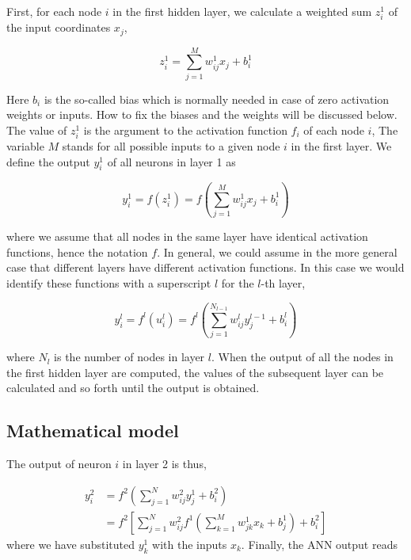 \documentclass[%
oneside,                 %
final,                   %
10pt]{article}
\begin{document}
First, for each node $i$ in the first hidden layer, we calculate a weighted sum $z_i^1$ of the input coordinates $x_j$,

\begin{equation} z_i^1 = \sum_{j=1}^{M} w_{ij}^1 x_j + b_i^1
\end{equation}

Here $b_i$ is the so-called bias which is normally needed in
case of zero activation weights or inputs. How to fix the biases and
the weights will be discussed below.  The value of $z_i^1$ is the
argument to the activation function $f_i$ of each node $i$, The
variable $M$ stands for all possible inputs to a given node $i$ in the
first layer.  We define  the output $y_i^1$ of all neurons in layer 1 as

\begin{equation}
 y_i^1 = f(z_i^1) = f\left(\sum_{j=1}^M w_{ij}^1 x_j  + b_i^1\right)
 \label{outputLayer1}
\end{equation}

where we assume that all nodes in the same layer have identical
activation functions, hence the notation $f$. In general, we could assume in the more general case that different layers have different activation functions.
In this case we would identify these functions with a superscript $l$ for the $l$-th layer,

\begin{equation}
 y_i^l = f^l(u_i^l) = f^l\left(\sum_{j=1}^{N_{l-1}} w_{ij}^l y_j^{l-1} + b_i^l\right)
 \label{generalLayer}
\end{equation}

where $N_l$ is the number of nodes in layer $l$. When the output of
all the nodes in the first hidden layer are computed, the values of
the subsequent layer can be calculated and so forth until the output
is obtained.

\subsection{Mathematical model}

The output of neuron $i$ in layer 2 is thus,

\begin{align}
 y_i^2 &= f^2\left(\sum_{j=1}^N w_{ij}^2 y_j^1 + b_i^2\right) \\
 &= f^2\left[\sum_{j=1}^N w_{ij}^2f^1\left(\sum_{k=1}^M w_{jk}^1 x_k + b_j^1\right) + b_i^2\right]
 \label{outputLayer2}
\end{align}
where we have substituted $y_k^1$ with the inputs $x_k$. Finally, the ANN output reads
\end{document}
